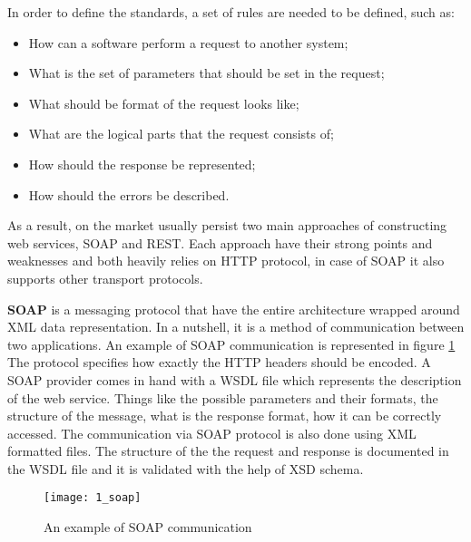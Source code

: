 In order to define the standards, a set of rules are needed to be defined, such as:
\begin{itemize}
    \item How can a software perform a request to another system;
    \item What is the set of parameters that should be set in the request;
    \item What should be format of the request looks like;
    \item What are the logical parts that the request consists of;
    \item How should the response be represented;
    \item How should the errors be described.
\end{itemize}

As a result, on the market usually persist two main approaches of constructing web services, SOAP and REST. Each approach have their strong points and weaknesses and both heavily relies on HTTP protocol, in case of SOAP it also supports other transport protocols.

\textbf{SOAP} is a messaging protocol that have the entire architecture wrapped around XML data representation. In a nutshell, it is a method of communication between two applications. An example of SOAP communication is represented in figure \mbox{\ref{soap}} The protocol specifies how exactly the HTTP headers should be encoded. A SOAP provider comes in hand with a WSDL file which represents the description of the web service. Things like the possible parameters and their formats, the structure of the message, what is the response format, how it can be correctly accessed. The communication via SOAP protocol is also done using XML formatted files. The structure of the the request and response is documented in the WSDL file and it is validated with the help of XSD schema.

\begin{figure}[!ht]
\centering
\texttt{[image: 1\_soap]}
\caption{An example of SOAP communication}\label{soap}
\end{figure}


